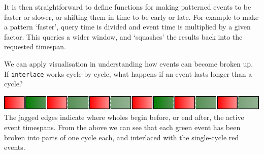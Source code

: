 It is then straightforward to define functions for making patterned
events to be faster or slower, or shifting them in time to be early or
late. For example to make a pattern `faster', query time is divided and
event time is multiplied by a given factor. This queries a wider window,
and `squashes' the results back into the requested timespan.

\begin{Shaded}
\begin{Highlighting}[]
  \OtherTok{{-}\textgreater{}} \OtherTok{{-}\textgreater{}} 
\OtherTok{=}\OperatorTok{/}\OperatorTok{*}
\OtherTok{=}\OperatorTok{*}\OperatorTok{/}
\OtherTok{=}\OperatorTok{+}
\OtherTok{=}\OperatorTok{+}
\end{Highlighting}
\end{Shaded}

We can apply visualisation in understanding how events can become broken
up. If \texttt{interlace} works cycle-by-cycle, what happens if an event
lasts longer than a cycle?

\begin{Shaded}
\begin{Highlighting}[]
\OtherTok{=}\NormalTok{ interlace [atom } \OperatorTok{$}\NormalTok{]}
\end{Highlighting}
\end{Shaded}

\includegraphics{../figures/fig4.pdf}\\

The jagged edges indicate where wholes begin before, or end after, the
active event timespans. From the above we can see that each green event
has been broken into parts of one cycle each, and interlaced with the
single-cycle red events.

